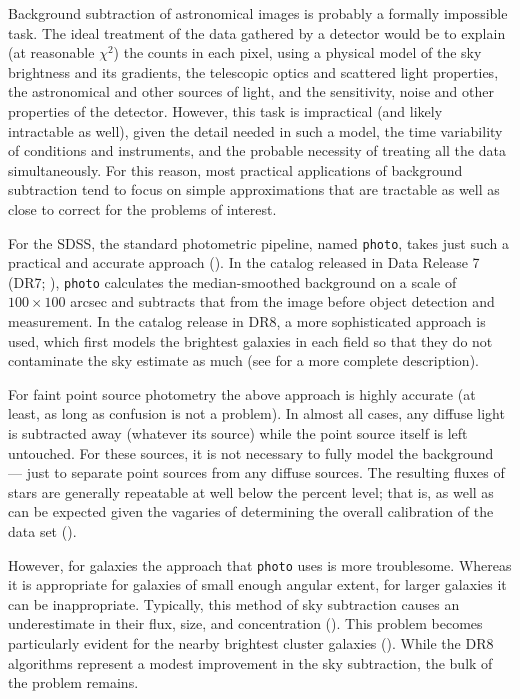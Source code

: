 \documentclass[10pt,preprint]{aastex}
\begin{document}
Background subtraction of astronomical images is probably a formally
impossible task.  The ideal treatment of the data gathered by a
detector would be to explain (at reasonable $\chi^2$) the counts in
each pixel, using a physical model of the sky brightness and its
gradients, the telescopic optics and scattered light properties, the
astronomical and other sources of light, and the sensitivity, noise
and other properties of the detector.
However, this task is impractical (and likely intractable as well),
given the detail needed in such a model, the time variability of
conditions and instruments, and the probable necessity of treating all
the data simultaneously. For this reason, most practical applications
of background subtraction tend to focus on simple approximations that
are tractable as well as close to correct for the problems of
interest.

For the SDSS, the standard photometric pipeline, named {\tt photo},
takes just such a practical and accurate approach
(\citealt{lupton01a}). In the catalog released in Data Release 7 (DR7;
\citealt{abazajian09a}), {\tt photo} calculates the median-smoothed
background on a scale of $100\times100$ arcsec and subtracts that from
the image before object detection and measurement.  In the catalog
release in DR8, a more sophisticated approach is used, which first
models the brightest galaxies in each field so that they do not
contaminate the sky estimate as much (see \citealt{aihara11a} for a
more complete description).

For faint point source photometry the above approach is highly
accurate (at least, as long as confusion is not a problem). In almost
all cases, any diffuse light is subtracted away (whatever its source)
while the point source itself is left untouched. For these sources, it
is not necessary to fully model the background --- just to separate
point sources from any diffuse sources. The resulting fluxes of stars
are generally repeatable at well below the percent level; that is, as
well as can be expected given the vagaries of determining the overall
calibration of the data set (\citealt{padmanabhan07a}).

However, for galaxies the approach that {\tt photo} uses is more
troublesome.  Whereas it is appropriate for galaxies of small enough
angular extent, for larger galaxies it can be inappropriate.
Typically, this method of sky subtraction causes an underestimate in
their flux, size, and concentration (\citealt{west05a, blanton05b,
hyde09a, west10a}). This problem becomes particularly evident for the
nearby brightest cluster galaxies (\citealt{bernardi07a,
lauer07a}). While the DR8 algorithms represent a modest improvement in
the sky subtraction, the bulk of the problem remains.
\end{document}
